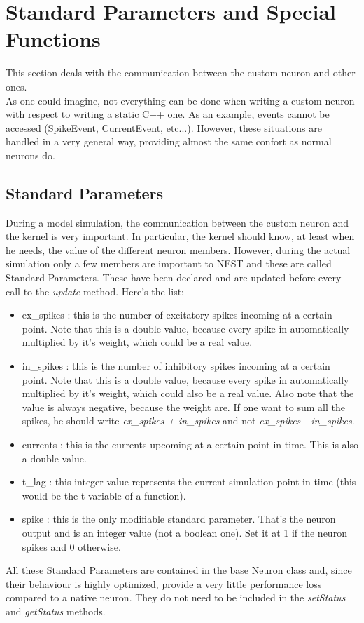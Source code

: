 \documentclass{article}
\begin{document}
\section{Standard Parameters and Special Functions}
This section deals with the communication between the custom neuron and other ones.\\
As one could imagine, not everything can be done when writing a custom neuron with respect to writing a static C++ one. As an example, events cannot be accessed (SpikeEvent, CurrentEvent, etc...). However, these situations are handled in a very general way, providing almost the same confort as normal neurons do.
\subsection*{Standard Parameters}
During a model simulation, the communication between the custom neuron and the kernel is very important. In particular, the kernel should know, at least when he needs, the value of the different neuron members. However, during the actual simulation only a few members are important to NEST and these are called Standard Parameters.
These have been declared and are updated before every call to the \emph{update} method. Here's the list:
\begin{itemize}
\item ex\_spikes : this is the number of excitatory spikes incoming at a certain point. Note that this is a double value, because every spike in automatically multiplied by it's weight, which could be a real value.
\item in\_spikes : this is the number of inhibitory spikes incoming at a certain point. Note that this is a double value, because every spike in automatically multiplied by it's weight, which could also be a real value. Also note that the value is always negative, because the weight are. If one want to sum all the spikes, he should write \emph{ex\_spikes + in\_spikes} and not \emph{ex\_spikes - in\_spikes}.
\item currents : this is the currents upcoming at a certain point in time. This is also a double value.
\item t\_lag : this integer value represents the current simulation point in time (this would be the t variable of a function).
\item spike : this is the only modifiable standard parameter. That's the neuron output and is an integer value (not a boolean one). Set it at 1 if the neuron spikes and 0 otherwise.
\end{itemize}
All these Standard Parameters are contained in the base Neuron class and, since their behaviour is highly optimized, provide a very little performance loss compared to a native neuron. They do not need to be included in the \emph{setStatus} and \emph{getStatus} methods.
\end{document}
